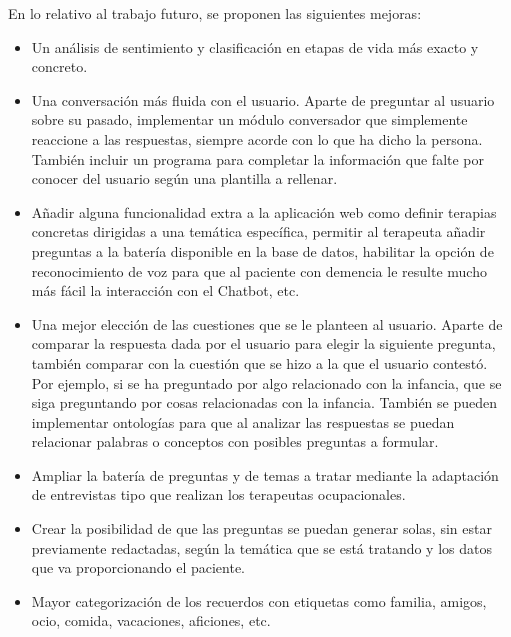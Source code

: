 En lo relativo al trabajo futuro, se proponen las siguientes mejoras:
\begin{itemize}
	\item Un análisis de sentimiento y clasificación en etapas de vida más exacto y concreto. 
	\item Una conversación más fluida con el usuario. Aparte de preguntar al usuario sobre su pasado, implementar un módulo conversador que simplemente reaccione a las respuestas, siempre acorde con lo que ha dicho la persona. También incluir un programa para completar la información que falte por conocer del usuario según una plantilla a rellenar.
	\item Añadir alguna funcionalidad extra a la aplicación web como definir terapias concretas dirigidas a una temática específica, permitir al terapeuta añadir preguntas a la batería disponible en la base de datos, habilitar la opción de reconocimiento de voz para que al paciente con demencia le resulte mucho más fácil la interacción con el Chatbot, etc.
	\item Una mejor elección de las cuestiones que se le planteen al usuario. Aparte de comparar la respuesta dada por el usuario para elegir la siguiente pregunta, también comparar con la cuestión que se hizo a la que el usuario contestó. Por ejemplo, si se ha preguntado por algo relacionado con la infancia, que se siga preguntando por cosas relacionadas con la infancia. También se pueden implementar ontologías para que al analizar las respuestas se puedan relacionar palabras o conceptos con posibles preguntas a formular.
	\item Ampliar la batería de preguntas y de temas a tratar mediante la adaptación de entrevistas tipo que realizan los terapeutas ocupacionales.
	\item Crear la posibilidad de que las preguntas se puedan generar solas, sin estar previamente redactadas, según la temática que se está tratando y los datos que va proporcionando el paciente. 
	\item Mayor categorización de los recuerdos con etiquetas como familia, amigos, ocio, comida, vacaciones, aficiones, etc.
\end{itemize}